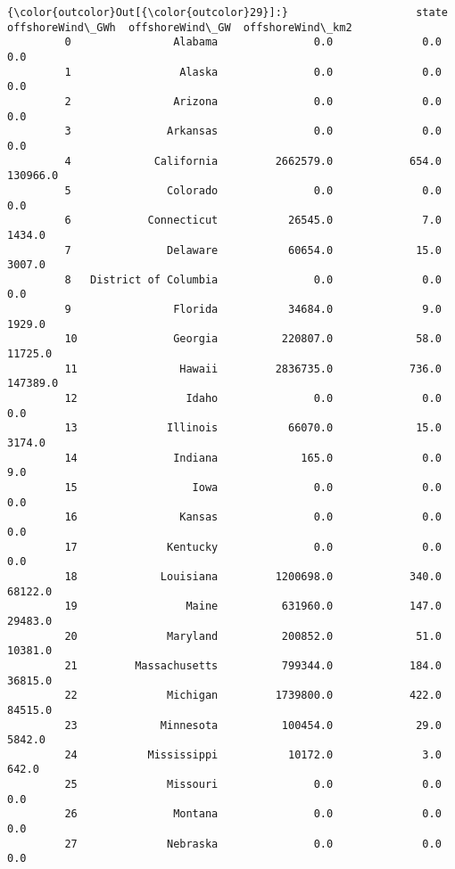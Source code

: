 \documentclass[11pt]{article}
\begin{document}
\begin{Verbatim}[commandchars=\\\{\}]
{\color{outcolor}Out[{\color{outcolor}29}]:}                    state  offshoreWind\_GWh  offshoreWind\_GW  offshoreWind\_km2
         0                Alabama               0.0              0.0               0.0
         1                 Alaska               0.0              0.0               0.0
         2                Arizona               0.0              0.0               0.0
         3               Arkansas               0.0              0.0               0.0
         4             California         2662579.0            654.0          130966.0
         5               Colorado               0.0              0.0               0.0
         6            Connecticut           26545.0              7.0            1434.0
         7               Delaware           60654.0             15.0            3007.0
         8   District of Columbia               0.0              0.0               0.0
         9                Florida           34684.0              9.0            1929.0
         10               Georgia          220807.0             58.0           11725.0
         11                Hawaii         2836735.0            736.0          147389.0
         12                 Idaho               0.0              0.0               0.0
         13              Illinois           66070.0             15.0            3174.0
         14               Indiana             165.0              0.0               9.0
         15                  Iowa               0.0              0.0               0.0
         16                Kansas               0.0              0.0               0.0
         17              Kentucky               0.0              0.0               0.0
         18             Louisiana         1200698.0            340.0           68122.0
         19                 Maine          631960.0            147.0           29483.0
         20              Maryland          200852.0             51.0           10381.0
         21         Massachusetts          799344.0            184.0           36815.0
         22              Michigan         1739800.0            422.0           84515.0
         23             Minnesota          100454.0             29.0            5842.0
         24           Mississippi           10172.0              3.0             642.0
         25              Missouri               0.0              0.0               0.0
         26               Montana               0.0              0.0               0.0
         27              Nebraska               0.0              0.0               0.0

\end{Verbatim}
\end{document}

